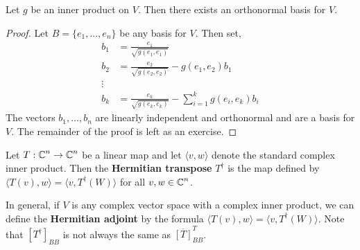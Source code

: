 \begin{thm} Let $g$ be an inner product on $V$. Then there exists an orthonormal basis for $V$.
\end{thm}
\begin{proof}
    Let $B=\{e_1,...,e_n\}$ be any basis for $V$. Then set,
    \begin{align*}
        b_1 &= \frac{e_1}{\sqrt{g(e_1,e_1)}}\\
        b_2 &= \frac{e_2}{\sqrt{g(e_2,e_2)}} - g(e_1,e_2)b_1\\
        \vdots\\
        b_k &= \frac{e_k}{\sqrt{g(e_k,e_k)}} - \sum_{i=1}^k g(e_i,e_k)b_i
    \end{align*}
    The vectors $b_1,...,b_n$ are linearly independent and orthonormal and are a basis for $V$. The remainder of the proof is left as an exercise.
\end{proof}
\begin{defn}
Let $T : \operatorname{\mathbb{C}}^n \to\operatorname{\mathbb{C}}^n$ be a linear map and let $\langle v,w\rangle$ denote the standard complex inner product. Then the \textbf{Hermitian transpose} $T^\dagger$ is the map defined by $\langle T(v),w\rangle = \langle v,T^\dagger(W)\rangle$ for all $v,w\in \operatorname{\mathbb{C}}^n$.
\end{defn}
\begin{defn} In general, if $V$ is any complex vector space with a complex inner product, we can define the \textbf{Hermitian adjoint} by the formula $\langle T(v),w\rangle = \langle v,T^\dagger(W)\rangle$. Note that $[T^\dagger]_{BB}$ is not always the same as $\overline{[T]}_{BB}^T$.
\end{defn}

